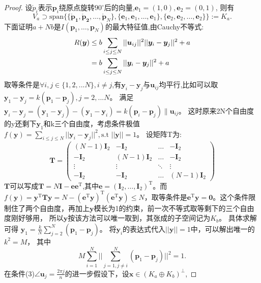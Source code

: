 \begin{proof}
设$\mathring{p}_i$表示$\bm{p}_i$绕原点旋转$90^{\circ}$后的向量,$\bm{e}_1=(1,0),\bm{e}_2=(0,1)$,
则有
\begin{equation}
V_a \supset\text{span}\{\{\bm{\mathring{p}_1},\bm{\mathring{p}_2},\dots,\bm{\mathring{p}} _N\},\{\bm{e}_1,\bm{e}_1,\dots,\bm{e}_1\},\{\bm{e}_2,\bm{e}_2,\dots,\bm{e}_2\}\}:=K_a.
\end{equation}
下面证明$a+Nb$是$I(\bm{p}_1,\dots,\bm{p}_N)$的最大特征值,由Cauchy不等式:
\begin{align}\notag
R(\bm{y})&\leq b\sum_{i\leq j\leq N} ||\bm{u}_{ij}||^2||\bm{y}_i-\bm{y}_j||^2+a\\
&=b\sum_{i\leq j\leq N}||\bm{y}_i-\bm{y}_j||^2+a
\end{align}
取等条件是$\forall i,j\in \{1,2,...N\},i\neq j$,有$\bm{y}_i-\bm{y}_j$与$\bm{u}_{ij}$均平行,比如可以取
$\bm{y}_1-\bm{y}_j=k(\bm{p}_1-\bm{p}_j),j=2,...N$。
满足
$\bm{y}_i-\bm{y}_j=(\bm{y}_1-\bm{y}_j)-(\bm{y}_1-\bm{y}_i)
=k(\bm{p}_i-\bm{p}_j)\parallel \bm{u}_{ij}$。
这时原来2N个自由度的y还剩下$\bm{y}_1$和k三个自由度，考虑条件极值
$f(\bm{y})=\sum_{i\leq j\leq N} ||\bm{y}_i-\bm{y}_j||^2,\text{s.t } ||\bm{y}||=1$。
设矩阵T为:
\begin{equation}
\bm{T}=\left(
\begin{array}{cccc}
(N-1)\bm{I}_2&-\bm{I}_2&\dots&-\bm{I}_2\\
-\bm{I}_2&(N-1)\bm{I}_2&\dots&-\bm{I}_2\\
\vdots & \vdots & \ddots & \vdots\\
-\bm{I}_2& -\bm{I}_2 & \dots & (N-1)\bm{I}_2
\end{array}
\right)
\end{equation}
$\bm{T}$可以写成$\bm{T}=N\bm{I}-\bm{e}\bm{e}^{\textrm{T}} $,其中$\bm{e}=(\bm{I}_2,\dots,\bm{I}_2)^{\textrm{T}} $。而$f(\bm{y})=\bm{y}^{\textrm{T}} \bm{T}\bm{y}=N-(\bm{e}^{\textrm{T}} \bm{y})^{\textrm{T}} (\bm{e}^{\textrm{T}} \bm{y})\leq N$，取等条件是$\bm{e}^{\textrm{T}} \bm{y}=\bm{0}$。这个条件限制住了两个自由度，再加上$\bm{y}$模长为1的约束，前一次不等式取等剩下的三个自由度刚好够用，
所以$\bm{y}$按该方法可以唯一取到，其张成的子空间记为$K_b$。
具体求解可得
$\bm{y}_1=\frac{k}{N}\sum_{j=2}^N (\bm{p}_1-\bm{p}_j)$。
将$\bm{y}_i$的表达式代入$||\bm{y}||=1$中，可以解出唯一的$k^2=M$，
其中
\begin{equation}
M\sum_{i=1}^N||\sum_{j=1,j\neq i}^N(\bm{p}_1-\bm{p}_j)||^2=1.
\end{equation}
  在条件(3)$\angle\bm{u}_j=\frac{2\pi j}{n}$的进一步假设下，设$\bm{x}\in (K_a\oplus K_b)^{\bot}$,

\end{proof}
